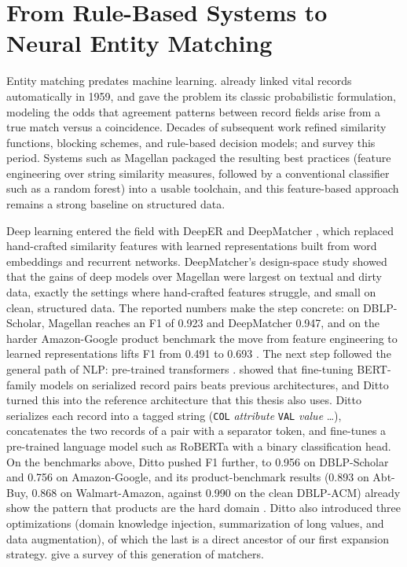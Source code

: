 \documentclass[a4paper,oneside,bibliography=totoc]{scrbook}
\begin{document}
\section{From Rule-Based Systems to Neural Entity Matching}
\label{sec:rw_neural}

Entity matching predates machine learning. \citet{newcombe1959automatic} already linked vital records automatically in 1959, and \citet{fellegi1969theory} gave the problem its classic probabilistic formulation, modeling the odds that agreement patterns between record fields arise from a true match versus a coincidence. Decades of subsequent work refined similarity functions, blocking schemes, and rule-based decision models; \citet{elmagarmid2007duplicate} and \citet{christen2012data} survey this period. Systems such as Magellan \cite{konda2016magellan} packaged the resulting best practices (feature engineering over string similarity measures, followed by a conventional classifier such as a random forest) into a usable toolchain, and this feature-based approach remains a strong baseline on structured data.

Deep learning entered the field with DeepER \cite{ebraheem2018distributed} and DeepMatcher \cite{mudgal2018deep}, which replaced hand-crafted similarity features with learned representations built from word embeddings and recurrent networks. DeepMatcher's design-space study showed that the gains of deep models over Magellan were largest on textual and dirty data, exactly the settings where hand-crafted features struggle, and small on clean, structured data. The reported numbers make the step concrete: on DBLP-Scholar, Magellan reaches an F1 of 0.923 and DeepMatcher 0.947, and on the harder Amazon-Google product benchmark the move from feature engineering to learned representations lifts F1 from 0.491 to 0.693 \cite{mudgal2018deep}. The next step followed the general path of NLP: pre-trained transformers \cite{vaswani2017attention,devlin2019bert}. \citet{brunner2020entity} showed that fine-tuning BERT-family models on serialized record pairs beats previous architectures, and Ditto \cite{li2020deep} turned this into the reference architecture that this thesis also uses. Ditto serializes each record into a tagged string (\texttt{COL} \emph{attribute} \texttt{VAL} \emph{value} \ldots), concatenates the two records of a pair with a separator token, and fine-tunes a pre-trained language model such as RoBERTa \cite{liu2019roberta} with a binary classification head. On the benchmarks above, Ditto pushed F1 further, to 0.956 on DBLP-Scholar and 0.756 on Amazon-Google, and its product-benchmark results (0.893 on Abt-Buy, 0.868 on Walmart-Amazon, against 0.990 on the clean DBLP-ACM) already show the pattern that products are the hard domain \cite{li2020deep}. Ditto also introduced three optimizations (domain knowledge injection, summarization of long values, and data augmentation), of which the last is a direct ancestor of our first expansion strategy. \citet{barlaug2021neural} give a survey of this generation of matchers.
\end{document}

